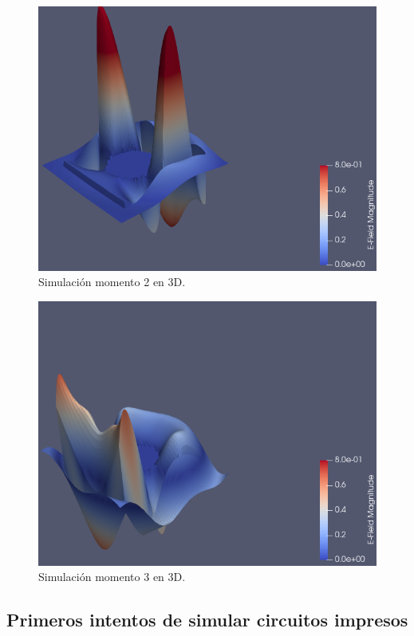 \documentclass[
    11pt,
    spanish,
	a4paper
]{article}
\begin{document}
\begin{figure}[htbp]
	\centering
	\includegraphics[width=\textwidth]{./img/mitad3d.png}
	\caption{Simulación momento 2 en 3D.}
	\label{fig:sim8}
\end{figure}

\begin{figure}[htbp]
	\centering
	\includegraphics[width=\textwidth]{./img/salida3d.png}
	\caption{Simulación momento 3 en 3D.}
	\label{fig:sim9}
\end{figure}

\subsection{Primeros intentos de simular circuitos impresos}
\end{document}
